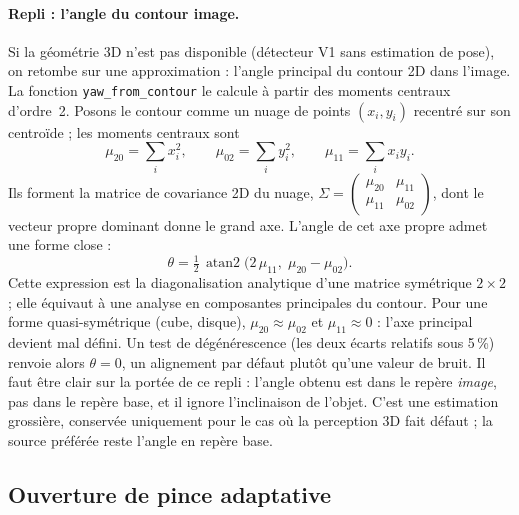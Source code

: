 \paragraph{Repli : l'angle du contour image.} Si la géométrie 3D n'est pas
disponible (détecteur V1 sans estimation de pose), on retombe sur une
approximation : l'angle principal du contour 2D dans l'image. La fonction
\texttt{yaw\_from\_contour} le calcule à partir des moments centraux d'ordre~2.
Posons le contour comme un nuage de points \((x_i, y_i)\) recentré sur son
centroïde ; les moments centraux sont
\[
  \mu_{20} = \sum_i x_i^2, \qquad
  \mu_{02} = \sum_i y_i^2, \qquad
  \mu_{11} = \sum_i x_i y_i .
\]
Ils forment la matrice de covariance 2D du nuage,
\(\Sigma = \left(\begin{smallmatrix}\mu_{20} & \mu_{11}\\ \mu_{11} & \mu_{02}\end{smallmatrix}\right)\),
dont le vecteur propre dominant donne le grand axe. L'angle de cet axe propre
admet une forme close :
\begin{equation}
  \theta = \tfrac{1}{2} \, \operatorname{atan2}\!\big(2\,\mu_{11},\; \mu_{20} - \mu_{02}\big) .
\end{equation}
Cette expression est la diagonalisation analytique d'une matrice symétrique
\(2\times2\) ; elle équivaut à une analyse en composantes principales du contour.
Pour une forme quasi-symétrique (cube, disque), \(\mu_{20} \approx \mu_{02}\) et
\(\mu_{11} \approx 0\) : l'axe principal devient mal défini. Un test de
dégénérescence (les deux écarts relatifs sous 5\,\%) renvoie alors
\(\theta = 0\), un alignement par défaut plutôt qu'une valeur de bruit. Il faut
être clair sur la portée de ce repli : l'angle obtenu est dans le repère
\emph{image}, pas dans le repère base, et il ignore l'inclinaison de l'objet.
C'est une estimation grossière, conservée uniquement pour le cas où la
perception 3D fait défaut ; la source préférée reste l'angle en repère base.

\subsection{Ouverture de pince adaptative}
\label{sub:plan_opening}

